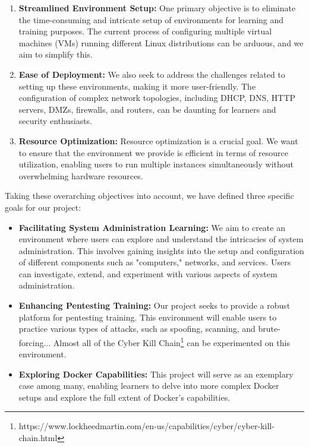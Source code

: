\documentclass[a4paper,11pt,singlespacing]{article}
\begin{document}
\begin{enumerate}
    \item \textbf{Streamlined Environment Setup:} One primary objective is to eliminate the time-consuming and intricate setup of environments for learning and training purposes. The current process of configuring multiple virtual machines (VMs) running different Linux distributions can be arduous, and we aim to simplify this.
    
    \item \textbf{Ease of Deployment:} We also seek to address the challenges related to setting up these environments, making it more user-friendly. The configuration of complex network topologies, including DHCP, DNS, HTTP servers, DMZs, firewalls, and routers, can be daunting for learners and security enthusiasts.
    
    \item \textbf{Resource Optimization:} Resource optimization is a crucial goal. We want to ensure that the environment we provide is efficient in terms of resource utilization, enabling users to run multiple instances simultaneously without overwhelming hardware resources.
\end{enumerate}

Taking these overarching objectives into account, we have defined three specific goals for our project:

\begin{itemize}
    \item \textbf{Facilitating System Administration Learning:} We aim to create an environment where users can explore and understand the intricacies of system administration. This involves gaining insights into the setup and configuration of different components such as "computers," networks, and services. Users can investigate, extend, and experiment with various aspects of system administration.

    \item \textbf{Enhancing Pentesting Training:} Our project seeks to provide a robust platform for pentesting training. This environment will enable users to practice various types of attacks, such as spoofing, scanning, and brute-forcing... Almost all of the Cyber Kill Chain\footnote{https://www.lockheedmartin.com/en-us/capabilities/cyber/cyber-kill-chain.html} can be experimented on this environment.

    \item \textbf{Exploring Docker Capabilities:} This project will serve as an exemplary case among many, enabling learners to delve into more complex Docker setups and explore the full extent of Docker's capabilities.

\end{itemize}
\end{document}
